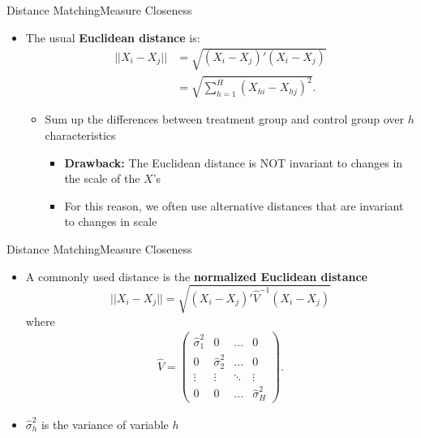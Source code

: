 \documentclass[hyperref={pdfpagelabels=false}]{beamer}
\begin{document}
\begin{frame}{Distance Matching}{Measure Closeness}
\begin{itemize}

\item The usual \textbf{Euclidean distance} is:
	\begin{equation*}
	\begin{aligned}
	||X_i-X_j||&=\sqrt{(X_i-X_j)'(X_i-X_j)} \\
	&=\sqrt{\sum^H_{h=1}(X_{hi}-X_{hj})^2}.
	\end{aligned}	
	\end{equation*}
\begin{itemize}
	
\item Sum up the differences between treatment group and control group over $h$ characteristics	
	\vspace{0.2cm}	
	\begin{itemize}
\item\textbf{Drawback:} The Euclidean distance is NOT invariant to changes in the scale of the $X$'s
\vspace{0.2cm}
\item For this reason, we often use alternative distances that are invariant to changes in scale
\end{itemize}

\end{itemize}
\end{itemize}
\end{frame}






\begin{frame}{Distance Matching}{Measure Closeness}
\begin{itemize}

\item A commonly used distance is the \textbf{normalized Euclidean distance}
	\begin{equation*}
	||X_i-X_j||=\sqrt{(X_i-X_j)'\widehat{V}^{-1}(X_i-X_j)} 
	\end{equation*}
where
	\begin{align*}
	\hat{V}=\left(
	\begin{array}{cccc}
	\hat{\sigma}^2_1& 0& ...& 0 \\
	0 & \hat{\sigma}^2_2 & ... & 0 \\
	\vdots & \vdots & \ddots & \vdots \\
	0 & 0 & ... & \hat{\sigma}^2_H
	\end{array}\right).
	\end{align*}
	\item $\hat{\sigma}^2_{h}$ is the variance of variable $h$	
\vspace{0.2cm}

\end{itemize}
\end{frame}
\end{document}
